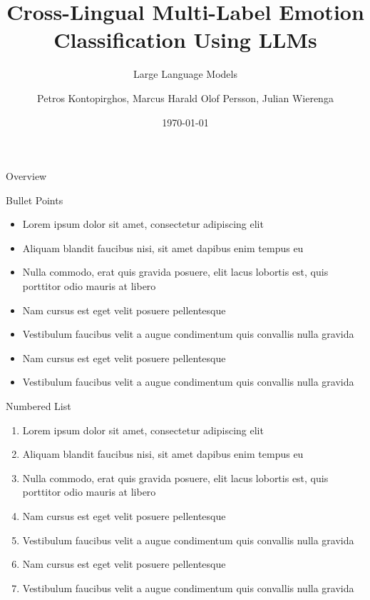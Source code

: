 \documentclass[aspectratio=169,xcolor=dvipsnames, t]{beamer}
\title[Emotional Classification Using LLMs]{Cross-Lingual Multi-Label Emotion Classification Using LLMs} %
\subtitle{Large Language Models}
\author{Petros Kontopirghos, Marcus Harald Olof Persson, Julian Wierenga}
\institute[University of Groningen, Faculty of Science and Engineering]{Faculty of Science and Engineering
\newline
University of Groningen
}
\date{\today} %
\begin{document}
\maketitlepage

\begin{frame}[t]{Overview}
    \tableofcontents
\end{frame}


\begin{frame}{Bullet Points}
    \begin{itemize}
        \item Lorem ipsum dolor sit amet, consectetur adipiscing elit
        \item Aliquam blandit faucibus nisi, sit amet dapibus enim tempus eu
        \item Nulla commodo, erat quis gravida posuere, elit lacus lobortis est, quis porttitor odio mauris at libero
        \item Nam cursus est eget velit posuere pellentesque
        \item Vestibulum faucibus velit a augue condimentum quis convallis nulla gravida
        \item Nam cursus est eget velit posuere pellentesque
        \item Vestibulum faucibus velit a augue condimentum quis convallis nulla gravida
    \end{itemize}
\end{frame}

\begin{frame}{Numbered List}
    \begin{enumerate}
        \item Lorem ipsum dolor sit amet, consectetur adipiscing elit
        \item Aliquam blandit faucibus nisi, sit amet dapibus enim tempus eu
        \item Nulla commodo, erat quis gravida posuere, elit lacus lobortis est, quis porttitor odio mauris at libero
        \item Nam cursus est eget velit posuere pellentesque
        \item Vestibulum faucibus velit a augue condimentum quis convallis nulla gravida
        \item Nam cursus est eget velit posuere pellentesque
        \item Vestibulum faucibus velit a augue condimentum quis convallis nulla gravida
    \end{enumerate}
\end{frame}
\end{document}

